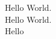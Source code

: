 \documentclass{article}
\begin{document}
\noindent Hello World.\\
\sffamily Hello World.\\
\test Hello
\end{document}
